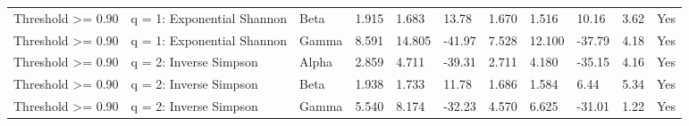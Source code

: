 \begin{landscape}
\begin{longtable}{L{3.0cm}L{2.4cm}L{1.5cm}*{6}{C{1.25cm}}C{1.65cm}C{1.35cm}}
Threshold >= 0.90 & q = 1: Exponential Shannon & Beta & 1.915 & 1.683 & 13.78 & 1.670 & 1.516 & 10.16 & 3.62 & Yes \\
Threshold >= 0.90 & q = 1: Exponential Shannon & Gamma & 8.591 & 14.805 & -41.97 & 7.528 & 12.100 & -37.79 & 4.18 & Yes \\
Threshold >= 0.90 & q = 2: Inverse Simpson & Alpha & 2.859 & 4.711 & -39.31 & 2.711 & 4.180 & -35.15 & 4.16 & Yes \\
Threshold >= 0.90 & q = 2: Inverse Simpson & Beta & 1.938 & 1.733 & 11.78 & 1.686 & 1.584 & 6.44 & 5.34 & Yes \\
Threshold >= 0.90 & q = 2: Inverse Simpson & Gamma & 5.540 & 8.174 & -32.23 & 4.570 & 6.625 & -31.01 & 1.22 & Yes \\
\end{longtable}
\end{landscape}
